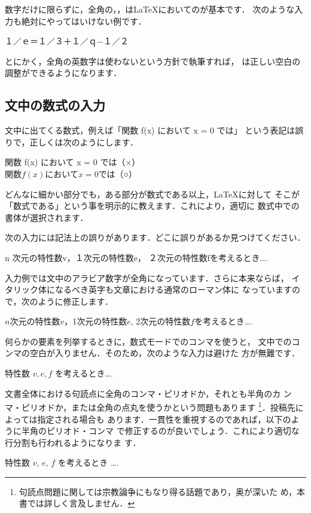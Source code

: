 %
%
数字だけに限らずに，全角の，，は\LaTeX においてのが基本です．
次のような入力も絶対にやってはいけない例です．
\begin{InOut}
１／ｅ＝１／３＋１／ｑ−１／２
\end{InOut}
とにかく，全角の英数字は使わないという方針で執筆すれば，
\laTEX は正しい空白の調整ができるようになります．

\subsection{文中の数式の入力}

文中に出てくる数式，例えば「関数 f(x) において x = 0 では」
という表記は誤りで，正しくは次のようにします．
\begin{InOut}
関数 f(x) において x = 0 では（×）\\
関数$f(x)$において$x = 0$では（○）
\end{InOut}
どんなに細かい部分でも，ある部分が数式である以上，\LaTeX に対して
そこが「数式である」という事を明示的に教えます．これにより，適切に
数式中での書体が選択されます．

\begin{Exe}
次の入力には記法上の誤りがあります．どこに誤りがあるか見つけてください．
\begin{InOut}
n 次元の特性数v，１次元の特性数e，
２次元の特性数fを考えるとき\ldots.
\end{InOut} 
入力例では文中のアラビア数字が全角になっています．さらに本来ならば，
イタリック体になるべき英字も文章における通常のローマン体に
なっていますので，次のように修正します．%
\begin{InOut}
$n$次元の特性数$v$，1次元の特性数$e$,
2次元の特性数$f$を考えるとき\ldots.
\end{InOut}
\end{Exe}

何らかの要素を列挙するときに，数式モードでのコンマ\str{,}を使うと，
文中でのコンマの空白が入りません．そのため，次のような入力は避けた
方が無難です．
\begin{InOut}
特性数 $v, e, f$ を考えるとき\ldots.
\end{InOut}
文書全体における句読点に全角のコンマ・ピリオドか，それとも半角のカ
ンマ・ピリオドか，または全角の点丸を使うかという問題もあります
\footnote{句読点問題に関しては宗教論争にもなり得る話題であり，奥が深いた
め，本書では詳しく言及しません．}．投稿先によっては指定される場合も
あります．一貫性を重視するのであれば，以下のように半角のピリオド・コンマ
で修正するのが良いでしょう．これにより適切な行分割も行われるようになりま
す．
\begin{InOut}
特性数 $v$, $e$, $f$ を考えるとき
\ldots. 
\end{InOut}

